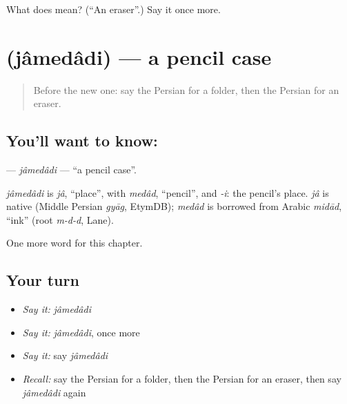 \begin{tcolorbox}[breakable,colback=teal!4,colframe=teal!35!black,title={Before you move on}]
What does   mean? (\textquotedblleft{}An eraser\textquotedblright{}.) Say it once more.
\end{tcolorbox}
\section[\texorpdfstring{\fa{جامدادی} (jâmedâdi)}{جامدادی (jâmedâdi)}]{ (jâmedâdi) — a pencil case}

\label{lesson:FA-C178-jamedadi}



\begin{quote}
Before the new one: say the Persian for a folder, then the Persian for an eraser.
\end{quote}

\subsection*{You'll want to know: }
\textbf{} — \emph{jâmedâdi} — \textquotedblleft{}a pencil case\textquotedblright{}.

\begin{cousinweb}
\emph{jâmedâdi} is \emph{jâ}, \textquotedblleft{}place\textquotedblright{}, with \emph{medâd}, \textquotedblleft{}pencil\textquotedblright{}, and \emph{-i}: the pencil's place. \emph{jâ} is native (Middle Persian \emph{gyāg}, EtymDB); \emph{medâd} is borrowed from Arabic \emph{midād}, \textquotedblleft{}ink\textquotedblright{} (root \emph{m-d-d}, Lane).
\end{cousinweb}

\begin{grammarlens}[title={What you've built}]
One more word for this chapter.
\end{grammarlens}

\subsection*{Your turn}
\begin{itemize}
\raggedright
  \item \emph{Say it:} \emph{jâmedâdi}
  \item \emph{Say it:} \emph{jâmedâdi}, once more
  \item \emph{Say it:} say \emph{jâmedâdi}
  \item \emph{Recall:} say the Persian for a folder, then the Persian for an eraser, then say \emph{jâmedâdi} again
\end{itemize}

